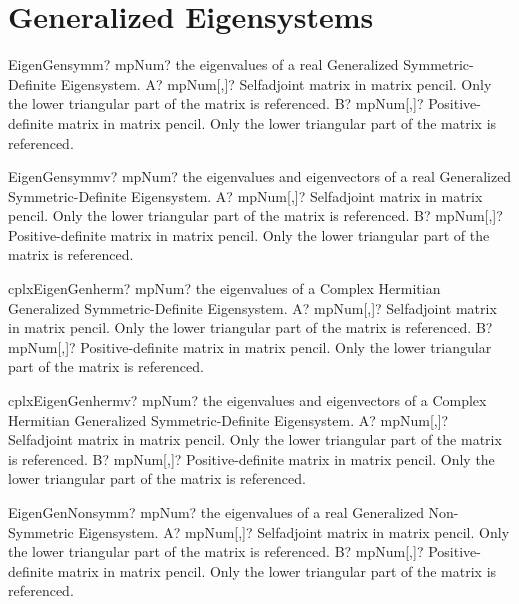 \documentclass[12pt,a4paper,openany]{book}
\begin{document}
\section{Generalized Eigensystems}

\begin{mpFunctionsExtract}
\mpFunctionTwo
{EigenGensymm? mpNum? the eigenvalues of a real Generalized Symmetric-Definite Eigensystem.}
{A? mpNum[,]? Selfadjoint matrix in matrix pencil. Only the lower triangular part of the matrix is referenced.}
{B? mpNum[,]? Positive-definite matrix in matrix pencil. Only the lower triangular part of the matrix is referenced.}
\end{mpFunctionsExtract}

\begin{mpFunctionsExtract}
\mpFunctionTwo
{EigenGensymmv? mpNum? the eigenvalues and eigenvectors of a real Generalized Symmetric-Definite Eigensystem.}
{A? mpNum[,]? Selfadjoint matrix in matrix pencil. Only the lower triangular part of the matrix is referenced.}
{B? mpNum[,]? Positive-definite matrix in matrix pencil. Only the lower triangular part of the matrix is referenced.}
\end{mpFunctionsExtract}

\begin{mpFunctionsExtract}
\mpFunctionTwo
{cplxEigenGenherm? mpNum? the eigenvalues of a Complex Hermitian Generalized Symmetric-Definite Eigensystem.}
{A? mpNum[,]? Selfadjoint matrix in matrix pencil. Only the lower triangular part of the matrix is referenced.}
{B? mpNum[,]? Positive-definite matrix in matrix pencil. Only the lower triangular part of the matrix is referenced.}
\end{mpFunctionsExtract}

\begin{mpFunctionsExtract}
\mpFunctionTwo
{cplxEigenGenhermv? mpNum? the eigenvalues and eigenvectors of a Complex Hermitian Generalized Symmetric-Definite Eigensystem.}
{A? mpNum[,]? Selfadjoint matrix in matrix pencil. Only the lower triangular part of the matrix is referenced.}
{B? mpNum[,]? Positive-definite matrix in matrix pencil. Only the lower triangular part of the matrix is referenced.}
\end{mpFunctionsExtract}

\begin{mpFunctionsExtract}
\mpFunctionTwo
{EigenGenNonsymm? mpNum? the eigenvalues of a real Generalized Non-Symmetric Eigensystem.}
{A? mpNum[,]? Selfadjoint matrix in matrix pencil. Only the lower triangular part of the matrix is referenced.}
{B? mpNum[,]? Positive-definite matrix in matrix pencil. Only the lower triangular part of the matrix is referenced.}
\end{mpFunctionsExtract}
\end{document}
